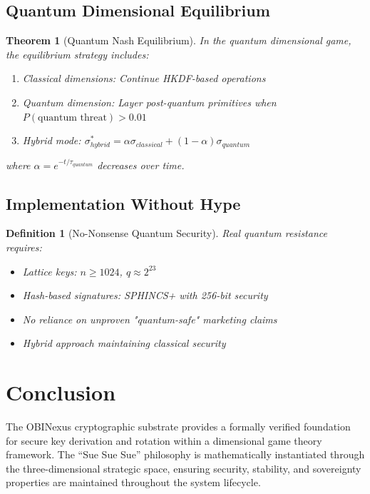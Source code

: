 \documentclass[11pt]{article}
\newtheorem{definition}{Definition}
\newtheorem{theorem}{Theorem}
\begin{document}
\subsection{Quantum Dimensional Equilibrium}

\begin{theorem}[Quantum Nash Equilibrium]
In the quantum dimensional game, the equilibrium strategy includes:
\begin{enumerate}
    \item Classical dimensions: Continue HKDF-based operations
    \item Quantum dimension: Layer post-quantum primitives when $P(\text{quantum threat}) > 0.01$
    \item Hybrid mode: $\sigma_{hybrid}^* = \alpha\sigma_{classical} + (1-\alpha)\sigma_{quantum}$
\end{enumerate}
where $\alpha = e^{-t/\tau_{quantum}}$ decreases over time.
\end{theorem}

\subsection{Implementation Without Hype}

\begin{definition}[No-Nonsense Quantum Security]
Real quantum resistance requires:
\begin{itemize}
    \item Lattice keys: $n \geq 1024$, $q \approx 2^{23}$
    \item Hash-based signatures: SPHINCS+ with 256-bit security
    \item No reliance on unproven "quantum-safe" marketing claims
    \item Hybrid approach maintaining classical security
\end{itemize}
\end{definition}

\section{Conclusion}

The OBINexus cryptographic substrate provides a formally verified foundation for secure key derivation and rotation within a dimensional game theory framework. The ``Sue Sue Sue'' philosophy is mathematically instantiated through the three-dimensional strategic space, ensuring security, stability, and sovereignty properties are maintained throughout the system lifecycle.
\end{document}
